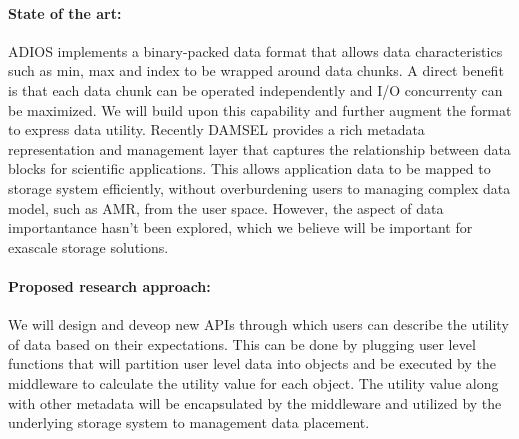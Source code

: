 \paragraph{State of the art:} ADIOS implements a binary-packed data format that allows
data characteristics such as min, max and index to be wrapped around data chunks. A
direct benefit is that each data chunk can be operated independently and I/O concurrenty
can be maximized. We will build upon this capability and further augment the format
to express data utility. Recently DAMSEL \cite{damsel} provides a rich metadata representation
and management layer that captures the relationship between data blocks for scientific applications.
This allows application data to be mapped to storage system efficiently, without overburdening
users to managing complex data model, such as AMR, from the user space. However, the aspect of 
data importantance hasn't been explored, which we believe will be important for exascale storage solutions. 

\paragraph{Proposed research approach:} 
We will design and deveop new APIs through which users can describe the utility of data
based on their expectations. This can be done by plugging user level functions that will
partition user level data into objects and be executed by the middleware to calculate the 
utility value for each object. The utility value along with other metadata will be encapsulated
by the middleware and utilized by the underlying storage system to management data placement.
